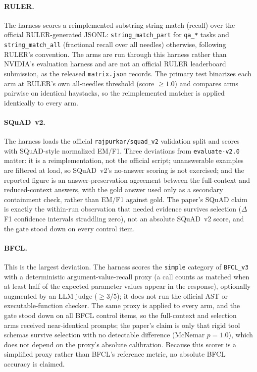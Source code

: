 \documentclass[11pt]{article}
\begin{document}
\paragraph{RULER.} The harness scores a reimplemented substring string-match (recall) over the
official RULER-generated JSONL: \texttt{string\_match\_part} for \texttt{qa\_*} tasks and
\texttt{string\_match\_all} (fractional recall over all needles) otherwise, following RULER's
convention. The arms are run through this harness rather than NVIDIA's evaluation harness and are
not an official RULER leaderboard submission, as the released \texttt{matrix.json} records. The
primary test binarizes each arm at RULER's own all-needles threshold (score $\ge 1.0$) and compares
arms pairwise on identical haystacks, so the reimplemented matcher is applied identically to every
arm.

\paragraph{SQuAD~v2.} The harness loads the official \texttt{rajpurkar/squad\_v2} validation split
and scores with SQuAD-style normalized EM/F1. Three deviations from \texttt{evaluate-v2.0} matter:
it is a reimplementation, not the official script; unanswerable examples are filtered at load, so
SQuAD~v2's no-answer scoring is not exercised; and the reported figure is an answer-preservation
agreement between the full-context and reduced-context answers, with the gold answer used only as a
secondary containment check, rather than EM/F1 against gold. The paper's SQuAD claim is exactly the
within-run observation that needed evidence survives selection ($\Delta$F1 confidence intervals
straddling zero), not an absolute SQuAD~v2 score, and the gate stood down on every control item.

\paragraph{BFCL.} This is the largest deviation. The harness scores the \texttt{simple} category of
\texttt{BFCL\_v3} with a deterministic argument-value-recall proxy (a call counts as matched when at
least half of the expected parameter values appear in the response), optionally augmented by an LLM
judge ($\ge 3/5$); it does not run the official AST or executable-function checker. The same proxy
is applied to every arm, and the gate stood down on all BFCL control items, so the full-context and
selection arms received near-identical prompts; the paper's claim is only that rigid tool schemas
survive selection with no detectable difference (McNemar $p{=}1.0$), which does not depend on the
proxy's absolute calibration. Because this scorer is a simplified proxy rather than BFCL's reference
metric, no absolute BFCL accuracy is claimed.
\end{document}

